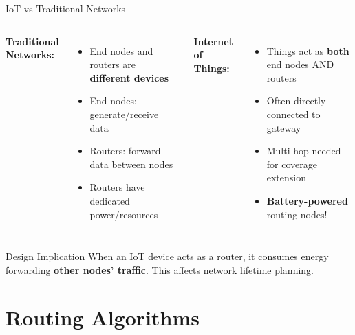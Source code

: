 \documentclass[aspectratio=169,11pt]{beamer}
\begin{document}
\begin{frame}{IoT vs Traditional Networks}
    \begin{columns}
        \textbf{Traditional Networks:}
        \begin{itemize}
            \item End nodes and routers are \textbf{different devices}
            \item End nodes: generate/receive data
            \item Routers: forward data between nodes
            \item Routers have dedicated power/resources
        \end{itemize}
        
        \textbf{Internet of Things:}
        \begin{itemize}
            \item Things act as \textbf{both} end nodes AND routers
            \item Often directly connected to gateway
            \item Multi-hop needed for coverage extension
            \item \textbf{Battery-powered} routing nodes!
        \end{itemize}
    \end{columns}
    
    \vspace{0.5cm}
    \begin{exampleblock}{Design Implication}
        When an IoT device acts as a router, it consumes energy forwarding \textbf{other nodes' traffic}. This affects network lifetime planning.
    \end{exampleblock}
\end{frame}

\section{Routing Algorithms}
\end{document}
